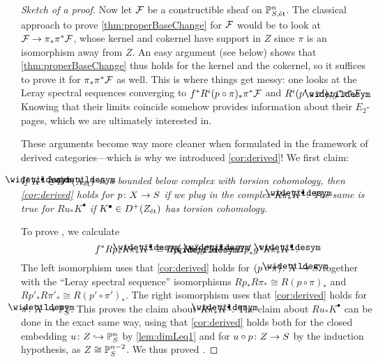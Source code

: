 \documentclass[a4paper, 10pt, oneside, DIV=9, chapterprefix=true, numbers=enddot, bibliography=totoc]{scrbook}
\begin{document}
\begin{proof}[Sketch of a proof]
	Now let $\mathcal{F}$ be a constructible sheaf on $\mathbb{P}_{S,\mathrm{\acute{e}t}}^n$. The classical approach to prove \cref{thm:properBaseChange} for $\mathcal{F}$ would be to look at $\Ff\morphism\pi_*\pi^*\Ff$, whose kernel and cokernel have support in $Z$ since $\pi$ is an isomorphism away from $Z$. An easy argument (see below) shows that \cref{thm:properBaseChange} thus holds for the kernel and the cokernel, so it suffices to prove it for $\pi_*\pi^*\mathcal{F}$ as well. This is where things get messy: one looks at the Leray spectral sequences converging to $f^*R^i(p\circ \pi)_*\pi^*\mathcal{F}$ and $R^i(p'\circ \pi')_*\snake{g}^*\pi^*\Ff$. Knowing that their limits coincide somehow provides information about their $E_2$-pages, which we are ultimately interested in.
	
	These arguments become way more cleaner when formulated in the framework of derived categories---which is why we introduced \cref{cor:derived}! We first claim:
	\begin{alphanumerate}
		\item[\itememph{*}] \itshape If $\snake{K}^\bullet\in D^+(\snake{X}_\et)$ is a bounded below complex with torsion cohomology, then \cref{cor:derived} holds for $p\colon X\morphism S$ if we plug in the complex $R\pi_*\snake{K}^\bullet$. The same is true for $Ru_*K^\bullet$ if $K^\bullet\in D^+(Z_{\mathrm{\acute{e}t}})$ has torsion cohomology.
	\end{alphanumerate}
	To prove \itememph{*}, we calculate
	\begin{equation*}
		f^*Rp_*R\pi_*\snake{K}^\bullet \cong Rp'_*R\pi'_*\snake{g}^*\snake{K}^\bullet\cong Rp'_*g^*R\pi_*\snake{K}^\bullet\,.
	\end{equation*}
	The left isomorphism uses that \cref{cor:derived} holds for $(p\circ \pi)\colon \snake{X}\morphism S$ together with the \enquote{Leray spectral sequence} isomorphisms $Rp_*R\pi_*\cong R(p\circ \pi)_*$ and $Rp'_*R\pi'_*\cong R(p'\circ \pi')_*$. The right isomorphism uses that \cref{cor:derived} holds for $\pi\colon \snake{X}\morphism \IP_S^n$. This proves the claim about $R\pi_*\snake{K}^\bullet$. The claim about $Ru_*K^\bullet$ can be done in the exact same way, using that \cref{cor:derived} holds both for the closed embedding $u\colon Z\monomorphism \IP_S^n$ by \cref{lem:dimLeq1} and for $u\circ p\colon Z\morphism S$ by the induction hypothesis, as $Z\cong \mathbb{P}_S^{n-2}$. We thus proved \itememph{*}.
	

\end{proof}
\end{document}
